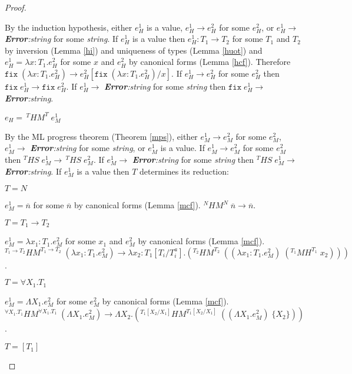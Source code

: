 \begin{hps}
\begin{proof}
\begin{hps-case-12}
By the induction hypothesis, either $e_{H}^{1}$ is a value, $e_{H}^{1}\rightarrow e_{H}^{2}$ for some $e_{H}^{2}$, or $e_{H}^{1}\rightarrow$ \emph{\textbf{Error}:\;string} for some \emph{string}.  If $e_{H}^{1}$ is a value then $e_{H}^{1}:T_{1}\rightarrow T_{2}$ for some $T_{1}$ and $T_{2}$ by inversion (Lemma \ref{hi}) and uniqueness of types (Lemma \ref{huot}) and $e_{H}^{1}=\lambda x:T_{1}.e_{H}^{2}$ for some $x$ and $e_{H}^{2}$ by canonical forms (Lemma \ref{hcf}).  Therefore $\mathtt{fix}\;(\lambda x:T_{1}.e_{H}^{2})\rightarrow e_{H}^{2}[\mathtt{fix}\;(\lambda x:T_{1}.e_{H}^{2})/x]$.  If $e_{H}^{1}\rightarrow e_{H}^{2}$ for some $e_{H}^{2}$ then $\mathtt{fix}\;e_{H}^{1}\rightarrow\mathtt{fix}\;e_{H}^{2}$.  If $e_{H}^{1}\rightarrow$ \emph{\textbf{Error}:\;string} for some \emph{string} then $\mathtt{fix}\;e_{H}^{1}\rightarrow$ \emph{\textbf{Error}:\;string}.
\end{hps-case-12}
\begin{hps-case-13}
$e_{H}=\,^{T}HM^{T}\;e_{M}^{1}$

By the ML progress theorem (Theorem \ref{mps}), either $e_{M}^{1}\rightarrow e_{M}^{2}$ for some $e_{M}^{2}$, $e_{M}^{1}\rightarrow$ \emph{\textbf{Error}:\;string} for some \emph{string}, or $e_{M}^{1}$ is a value.  If $e_{M}^{1}\rightarrow e_{M}^{2}$ for some $e_{M}^{2}$ then $^{T}HS\;e_{M}^{1}\rightarrow\,^{T}HS\;e_{M}^{2}$.  If $e_{M}^{1}\rightarrow$ \emph{\textbf{Error}:\;string} for some \emph{string} then $^{T}HS\;e_{M}^{1}\rightarrow$ \emph{\textbf{Error}:\;string}.  If $e_{M}^{1}$ is a value then $T$ determines its reduction:
\begin{hps-case-13-1}
$T=N$

$e_{M}^{1}=\overline{n}$ for some $\overline{n}$ by canonical forms (Lemma \ref{mcf}).  $^{N}HM^{N}\;\overline{n}\rightarrow\overline{n}$.
\end{hps-case-13-1}
\begin{hps-case-13-2}
$T=T_{1}\rightarrow T_{2}$

$e_{M}^{1}=\lambda x_{1}:T_{1}.e_{M}^{2}$ for some $x_{1}$ and $e_{M}^{2}$ by canonical forms (Lemma \ref{mcf}).  $^{T_{1}\rightarrow T_{2}}HM^{T_{1}\rightarrow T_{2}}\;(\lambda x_{1}:T_{1}.e_{M}^{2})\rightarrow\lambda x_{2}:T_{1}[T_{i}/T^{a}_{i}].(^{T_{2}}HM^{T_{2}}\;((\lambda x_{1}:T_{1}.e_{M}^{2})\;(^{T_{1}}MH^{T_{1}}\;x_{2})))$.
\end{hps-case-13-2}
\begin{hps-case-13-3}
$T=\forall X_{1}.T_{1}$

$e_{M}^{1}=\Lambda X_{1}.e_{M}^{2}$ for some $e_{M}^{2}$ by canonical forms (Lemma \ref{mcf}).  $^{\forall X_{1}.T_{1}}HM^{\forall X_{1}.T_{1}}\;(\Lambda X_{1}.e_{M}^{2})\rightarrow\Lambda X_{2}.(^{T_{1}[X_{2}/X_{1}]}HM^{T_{1}[X_{2}/X_{1}]}\;((\Lambda X_{1}.e_{M}^{2})\;\lbrace X_{2}\rbrace))$.
\end{hps-case-13-3}
\begin{hps-case-13-4}
$T=[T_{1}]$


\end{hps-case-13-4}
\end{hps-case-13}
\end{proof}
\end{hps}
